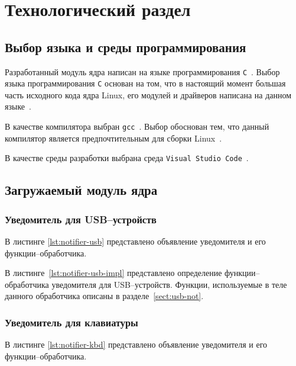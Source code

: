\chapter{Технологический раздел}

\section{Выбор языка и среды программирования}

Разработанный модуль ядра написан на языке программирования \texttt{C}~\cite{c-language}. Выбор языка программирования \texttt{С} основан на том, что в настоящий момент большая часть исходного кода ядра Linux, его модулей и драйверов написана на данном языке~\cite{rust-in-linux}.

В качестве компилятора выбран \texttt{gcc}~\cite{gcc}. Выбор обоснован тем, что данный компилятор является предпочтительным для сборки Linux~\cite{build-linux}.

В качестве среды разработки выбрана среда \texttt{Visual Studio Code}~\cite{vscode}.

\section{Загружаемый модуль ядра}

\subsection{Уведомитель для USB--устройств}

В листинге \ref{lst:notifier-usb} представлено объявление уведомителя и его функции--обработчика.


В листинге~\ref{lst:notifier-usb-impl} представлено определение функции--обработчика уведомителя для USB--устройств. Функции, используемые в теле данного обработчика описаны в разделе~\ref{sect:usb-not}.


\subsection{Уведомитель для клавиатуры}

В листинге \ref{lst:notifier-kbd} представлено объявление уведомителя и его функции--обработчика.

